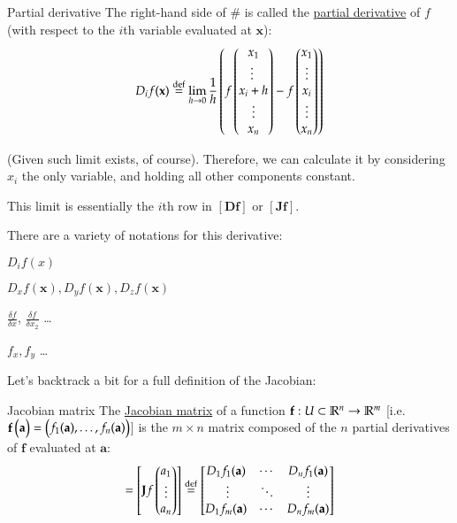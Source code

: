 \begin{defn}{Partial derivative}
The right-hand side of $\#$ is called the \ul{partial derivative} of $f$ (with respect to the $i$th variable evaluated at $\bm{x}$): 
\begin{equation}
	D_i f(\textbf{x})\overset{\mathrm{def}}{=}\lim_{h\rightarrow 0}\frac{1}{h} \left(f\begin{pmatrix} x_1  \\ \vdots\ \\ x_i + h \\ \vdots \\ x_n \end{pmatrix} - f\begin{pmatrix} x_1 \\ \vdots \\ x_i \\ \vdots \\ x_n \end{pmatrix}\right)
\end{equation}

(Given such limit exists, of course). Therefore, we can calculate it by considering $x_i$ the only variable, and holding all other components constant.

This limit is essentially the $i$th row in $[\bm{Df}]$ or $[\bm{Jf}]$. 
\end{defn}

There are a variety of notations for this derivative:
\begin{itemize}
\begin{minipage}{0.5\linewidth}
  \item $D_i f(x)$
  \item $D_x f(\bm{x}), D_y f(\bm{x}), D_z f(\bm{x})$
\end{minipage}\begin{minipage}{0.5\linewidth}
  \item $\frac{\delta f}{\delta x}$, $\frac{\delta f}{\delta x_2}$ \dots
  \item $f_x, f_y$ \dots
  \end{minipage}
\end{itemize}

Let's backtrack a bit for a full definition of the Jacobian: 
\begin{defn}{Jacobian matrix}
	The \ul{Jacobian matrix} of a function $\textbf{f} : U\subset \mathbb{R}^n\to \mathbb{R}^m$ [i.e. $\textbf{f}\begin{pmatrix} \textbf{a} \end{pmatrix} = \begin{pmatrix} f_1(\textbf{a}),\dots,f_n(\textbf{a}) \end{pmatrix}$] is the $m \times n$ matrix composed of the $n$ partial derivatives of $\bm{f}$ evaluated at $\bm{a}$: 
\begin{equation}
	[\bm{Jf}(\bm{a})] = \mtrx{\bm{J}f\Point{a_1 \\ \vdots \\ a_n}} \overset{\mathrm{def}}{=} \mtrx{D_1f_1(\bm{a}) & \cdots & D_nf_1(\bm{a}) \\ \ \vdots & \ddots & \vdots \\ D_1f_m(\bm{a}) & \cdots & D_nf_m(\bm{a})}
\end{equation}
\end{defn}


